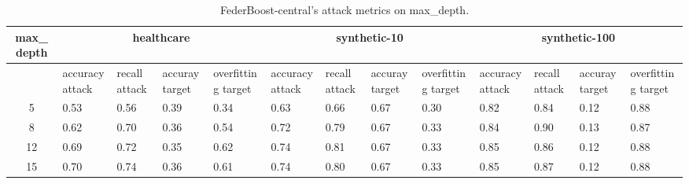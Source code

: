 \begin{table*}[]\centering
\begin{tabular}{|c| *{12}{m{1.0cm}|}}
\hline\rowcolor{gray!50}
\cellcolor{gray!80} max_depth & \multicolumn{4}{c|}{healthcare} & \multicolumn{4}{c|}{synthetic-10} & \multicolumn{4}{c|}{synthetic-100}\\\hline 
& accuracy attack & recall attack & accuray target & overfitting target & accuracy attack & recall attack & accuray target & overfitting target & accuracy attack & recall attack & accuray target & overfitting target\\\hline
5 & 0.53 & 0.56 & 0.39 & 0.34 & 0.63 & 0.66 & 0.67 & 0.30 & 0.82 & 0.84 & 0.12 & 0.88\\ \hline
8 & 0.62 & 0.70 & 0.36 & 0.54 & 0.72 & 0.79 & 0.67 & 0.33 & 0.84 & 0.90 & 0.13 & 0.87\\ \hline
12 & 0.69 & 0.72 & 0.35 & 0.62 & 0.74 & 0.81 & 0.67 & 0.33 & 0.85 & 0.86 & 0.12 & 0.88\\ \hline
15 & 0.70 & 0.74 & 0.36 & 0.61 & 0.74 & 0.80 & 0.67 & 0.33 & 0.85 & 0.87 & 0.12 & 0.88\\ \hline
\end{tabular} 
\caption{FederBoost-central's attack metrics on max_depth.}
\label{tab:experiment1_max_depth}
\end{table*}
